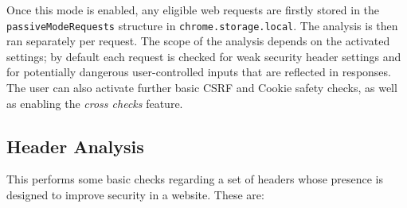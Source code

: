 Once this mode is enabled, any eligible web requests are firstly stored in the \texttt{passiveModeRequests} structure in \texttt{chrome.storage.local}. The analysis is then ran separately per request. The scope of the analysis depends on the activated settings; by default each request is checked for weak security header settings and for potentially dangerous user-controlled inputs that are reflected in responses. The user can also activate further basic CSRF and Cookie safety checks, as well as enabling the \textit{cross checks} feature. 




\subsection{Header Analysis}

This performs some basic checks regarding a set of headers whose presence is designed to improve security in a website. These are:

